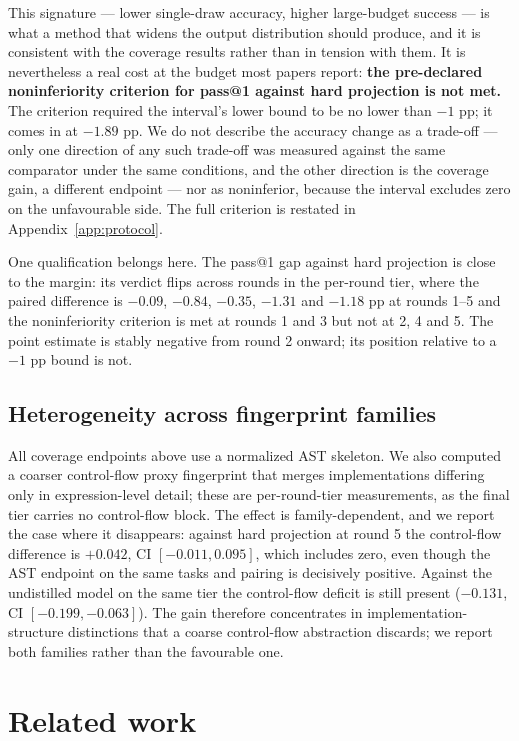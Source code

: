 \documentclass{article}
\begin{document}
This signature --- lower single-draw accuracy, higher large-budget success --- is what a method that widens the output distribution should produce, and it is consistent with the coverage results rather than in tension with them. It is nevertheless a real cost at the budget most papers report: \textbf{the pre-declared noninferiority criterion for pass@1 against hard projection is not met.} The criterion required the interval's lower bound to be no lower than $-1$ pp; it comes in at $-1.89$ pp. We do not describe the accuracy change as a trade-off --- only one direction of any such trade-off was measured against the same comparator under the same conditions, and the other direction is the coverage gain, a different endpoint --- nor as noninferior, because the interval excludes zero on the unfavourable side. The full criterion is restated in Appendix~\ref{app:protocol}.

One qualification belongs here. The pass@1 gap against hard projection is close to the margin: its verdict flips across rounds in the per-round tier, where the paired difference is $-0.09$, $-0.84$, $-0.35$, $-1.31$ and $-1.18$ pp at rounds 1--5 and the noninferiority criterion is met at rounds 1 and 3 but not at 2, 4 and 5. The point estimate is stably negative from round 2 onward; its position relative to a $-1$ pp bound is not.

\subsection{Heterogeneity across fingerprint families}
\label{sec:hetero}

All coverage endpoints above use a normalized AST skeleton. We also computed a coarser control-flow proxy fingerprint that merges implementations differing only in expression-level detail; these are per-round-tier measurements, as the final tier carries no control-flow block. The effect is family-dependent, and we report the case where it disappears: against hard projection at round 5 the control-flow difference is $+0.042$, CI $[-0.011,0.095]$, which includes zero, even though the AST endpoint on the same tasks and pairing is decisively positive. Against the undistilled model on the same tier the control-flow deficit is still present ($-0.131$, CI $[-0.199,-0.063]$). The gain therefore concentrates in implementation-structure distinctions that a coarse control-flow abstraction discards; we report both families rather than the favourable one.

\section{Related work}
\label{sec:related}
\end{document}
